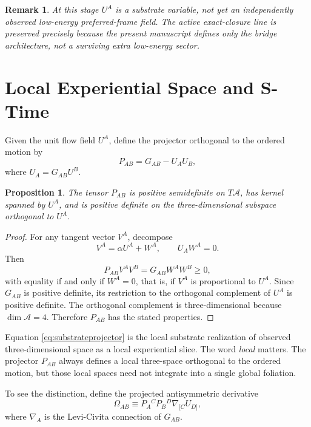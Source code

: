 \documentclass[11pt]{article}
\newcommand{\Sub}{\mathcal{A}}
\newtheorem{proposition}{Proposition}
\newtheorem{remark}{Remark}
\begin{document}
\begin{remark}
At this stage \(U^A\) is a substrate variable, not yet an independently observed low-energy preferred-frame field. The active exact-closure line is preserved precisely because the present manuscript defines only the bridge architecture, not a surviving extra low-energy sector.
\end{remark}

\section{Local Experiential Space and S-Time}

Given the unit flow field \(U^A\), define the projector orthogonal to the ordered motion by
\begin{equation}
P_{AB} = G_{AB} - U_A U_B,
\label{eq:substrateprojector}
\end{equation}
where \(U_A = G_{AB} U^B\).

\begin{proposition}
The tensor \(P_{AB}\) is positive semidefinite on \(T\Sub\), has kernel spanned by \(U^A\), and is positive definite on the three-dimensional subspace orthogonal to \(U^A\).
\end{proposition}

\begin{proof}
For any tangent vector \(V^A\), decompose
\[
V^A = \alpha U^A + W^A,
\qquad
U_A W^A = 0.
\]
Then
\[
P_{AB} V^A V^B
=
G_{AB} W^A W^B \ge 0,
\]
with equality if and only if \(W^A = 0\), that is, if \(V^A\) is proportional to \(U^A\). Since \(G_{AB}\) is positive definite, its restriction to the orthogonal complement of \(U^A\) is positive definite. The orthogonal complement is three-dimensional because \(\dim \Sub = 4\). Therefore \(P_{AB}\) has the stated properties.
\end{proof}

Equation \eqref{eq:substrateprojector} is the local substrate realization of observed three-dimensional space as a local experiential slice. The word \emph{local} matters. The projector \(P_{AB}\) always defines a local three-space orthogonal to the ordered motion, but those local spaces need not integrate into a single global foliation.

To see the distinction, define the projected antisymmetric derivative
\begin{equation}
\Omega_{AB}
\equiv
P_A{}^C P_B{}^D \nabla_{[C} U_{D]},
\label{eq:substratevorticity}
\end{equation}
where \(\nabla_A\) is the Levi-Civita connection of \(G_{AB}\).
\end{document}

